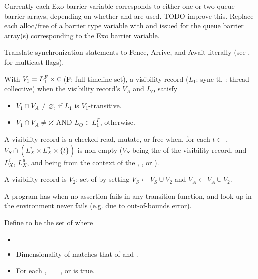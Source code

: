 \filbreak
{} Currently each Exo barrier variable corresponds to either one or two queue barrier arrays, depending on whether  and  are used.
TODO improve this.
Replace each alloc/free of a barrier type variable with  and  issued for the queue barrier array(s) corresponding to the Exo barrier variable.

\filbreak
Translate synchronization statements to Fence, Arrive, and Await literally (see , for multicast flags).

\filbreak
{}

With $V_1 = L_1^F \times \lighttt{C}$ (F: full timeline set), a visibility record  ($L_1$: sync-tl, : thread collective) when the visibility record's $V_A$ and $L_O$ satisfy
\begin{itemize}
  \item $V_1 \cap V_A \ne \varnothing$, if $L_1$ is $V_1$-transitive.
  \filbreak
  \item $V_1 \cap V_A \ne \varnothing$ AND $L_O \in L_1^F$, otherwise.
\end{itemize}

\filbreak
A visibility record is  a checked read, mutate, or free when, for each $t \in$ , $V_S \cap (L_X^i \times L_X^u \times \{ t \})$ is non-empty ($V_S$ being the  of the visibility record, and $L_X^i$, $L_X^u$, and  being from the context of the , , or ).

\filbreak
A visibility record is  $V_2$: set of  by setting $V_S \leftarrow V_S \cup V_2$ and $V_A \leftarrow V_A \cup V_2$.

\filbreak
A program has  when no assertion fails in any transition function, and look up in the environment never fails (e.g. due to out-of-bounds error).

\filbreak
Define  to be the set of  where
\begin{itemize}
  \item {} $=$ 
  \filbreak
  \item Dimensionality of  matches that of  and .
  \filbreak
  \item For each ,  $=$ , or  is true.
\end{itemize}

